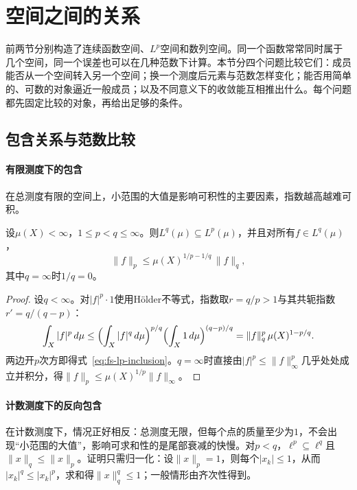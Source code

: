 
\section{空间之间的关系}
\label{sec:fs-relations}

前两节分别构造了连续函数空间、$L^p$空间和数列空间。同一个函数常常同时属于几个空间，同一个误差也可以在几种范数下计算。本节分四个问题比较它们：成员能否从一个空间转入另一个空间；换一个测度后元素与范数怎样变化；能否用简单的、可数的对象逼近一般成员；以及不同意义下的收敛能互相推出什么。每个问题都先固定比较的对象，再给出足够的条件。

\subsection{包含关系与范数比较}
\label{sec:fs-inclusions}

\paragraph{有限测度下的包含}
在总测度有限的空间上，小范围的大值是影响可积性的主要因素，指数越高越难可积。

\begin{theorem}[有限测度下的$L^p$包含]
\label{thm:fs-lp-inclusion}
设$\mu(X)<\infty$，$1\leq p<q\leq\infty$。则$L^q(\mu)\subseteq L^p(\mu)$，并且对所有$f\in L^q(\mu)$，
\begin{equation}
 \|f\|_p\leq\mu(X)^{1/p-1/q}\,\|f\|_q ,
 \label{eq:fs-lp-inclusion}
\end{equation}
其中$q=\infty$时$1/q=0$。
\end{theorem}

\begin{proof}
设$q<\infty$。对$|f|^p\cdot1$使用Hölder不等式，指数取$r=q/p>1$与其共轭指数$r'=q/(q-p)$：
\[
 \int_X|f|^p\,d\mu\leq\Bigl(\int_X|f|^q\,d\mu\Bigr)^{p/q}\Bigl(\int_X1\,d\mu\Bigr)^{(q-p)/q}=\|f\|_q^p\,\mu(X)^{1-p/q}.
\]
两边开$p$次方即得式~\eqref{eq:fs-lp-inclusion}。$q=\infty$时直接由$|f|^p\leq\|f\|_\infty^p$几乎处处成立并积分，得$\|f\|_p\leq\mu(X)^{1/p}\|f\|_\infty$。
\end{proof}

\paragraph{计数测度下的反向包含}
在计数测度下，情况正好相反：总测度无限，但每个点的质量至少为$1$，不会出现“小范围的大值”，影响可求和性的是尾部衰减的快慢。对$p<q$，$\ell^p\subseteq\ell^q$且$\|x\|_q\leq\|x\|_p$。证明只需归一化：设$\|x\|_p=1$，则每个$|x_k|\leq1$，从而$|x_k|^q\leq|x_k|^p$，求和得$\|x\|_q^q\leq1$；一般情形由齐次性得到。

